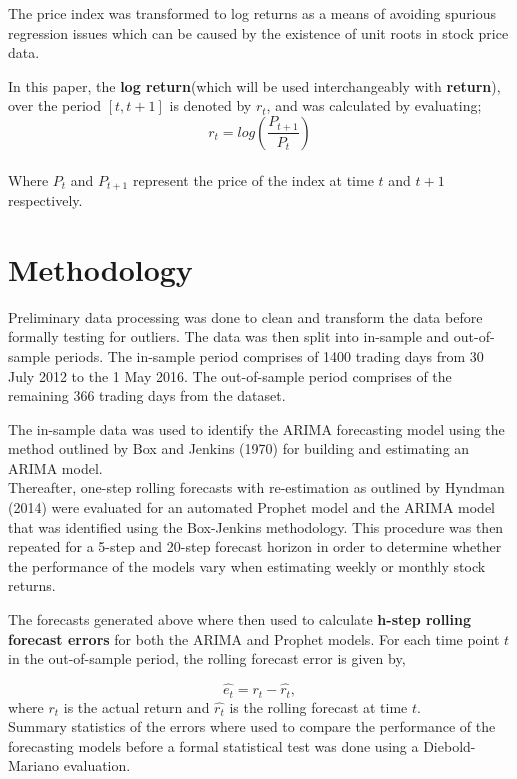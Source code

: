 \documentclass[12pt,a4paper]{article}
\numberwithin{equation}{section}
\numberwithin{figure}{section}
\numberwithin{table}{section}
\begin{document}
The price index was transformed to log returns as a means of avoiding
spurious regression issues which can be caused by the existence of unit
roots in stock price data.

In this paper, the \textbf{log return}(which will be used
interchangeably with \textbf{return}), over the period \([t,t+1]\) is
denoted by \(r_t\), and was calculated by evaluating;\\
\[
r_t = log(\frac{P_{t+1}}{P_t})  \label{eq1}
\]\\
Where \(P_t\) and \(P_{t+1}\) represent the price of the index at time
\(t\) and \(t+1\) respectively.

\section{Methodology}\label{methodology}

Preliminary data processing was done to clean and transform the data
before formally testing for outliers. The data was then split into
in-sample and out-of-sample periods. The in-sample period comprises of
1400 trading days from 30 July 2012 to the 1 May 2016. The out-of-sample
period comprises of the remaining 366 trading days from the dataset.

The in-sample data was used to identify the ARIMA forecasting model
using the method outlined by Box and Jenkins (1970) for building and
estimating an ARIMA model.\\
Thereafter, one-step rolling forecasts with re-estimation as outlined by
Hyndman (2014) were evaluated for an automated Prophet model and the
ARIMA model that was identified using the Box-Jenkins methodology. This
procedure was then repeated for a 5-step and 20-step forecast horizon in
order to determine whether the performance of the models vary when
estimating weekly or monthly stock returns.

The forecasts generated above where then used to calculate
\textbf{h-step rolling forecast errors} for both the ARIMA and Prophet
models. For each time point \(t\) in the out-of-sample period, the
rolling forecast error is given by,

\[ \hat{e_t} = r_t - \hat{r_t},\] where \(r_t\) is the actual return and
\(\hat{r_t}\) is the rolling forecast at time \(t\).\\
Summary statistics of the errors where used to compare the performance
of the forecasting models before a formal statistical test was done
using a Diebold-Mariano evaluation.
\end{document}
